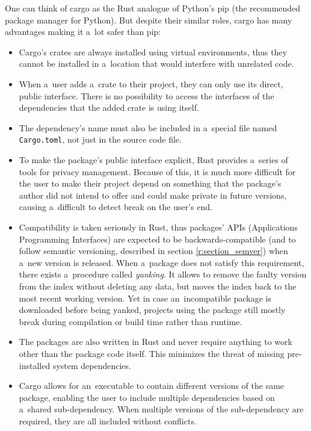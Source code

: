 \documentclass[licencjacka,en]{pracamgr}
\begin{document}
One can think of cargo as the Rust analogue of Python's pip (the recommended package manager for
Python). But despite their similar roles,
cargo has many advantages making it a~lot safer than pip:
\begin{itemize}
	\item Cargo's crates are always installed using virtual environments, thus they cannot be
		installed in a~location that would interfere with unrelated code.
	\item When a~user adds a~crate to their project, they can only use its direct,
		public interface.
		There is no possibility to access the interfaces of the dependencies that the added crate
		is using itself.
	\item The dependency's name must also be included in a~special file named \texttt{Cargo.toml},
		not just in the source code file.
	\item To make the package's public interface explicit, Rust provides a~series of tools for
		privacy management. Because of this, it is much more difficult for the user to make their
		project depend on something that the package's author did not intend to offer and could
		make private in future versions, causing a~difficult to detect break on the user's end.
	\item Compatibility is taken seriously in Rust, thus packages' APIs (Applications Programming
		Interfaces) are expected to be backwards-compatible (and to follow semantic versioning,
		described in section \ref{r:section_semver}) when a~new version is released. When a~package
		does not satisfy this requirement, there exists a~procedure called \textit{yanking}.
		It allows to remove the faulty version from the index without deleting any data, but moves
		the index back to the most recent working version. Yet in case an~incompatible package is
		downloaded before being yanked, projects using the package still mostly break during
		compilation or build time rather than runtime.
	\item The packages are also written in Rust and never require anything to work other than the
		package code itself. This minimizes the threat of missing pre-installed
		system dependencies.
	\item Cargo allows for an~executable to contain different versions of the same package,
		enabling the user to include multiple dependencies based on a~shared sub-dependency.
		When multiple versions of the sub-dependency are required, they are all included
		without conflicts.
\end{itemize}
\end{document}
